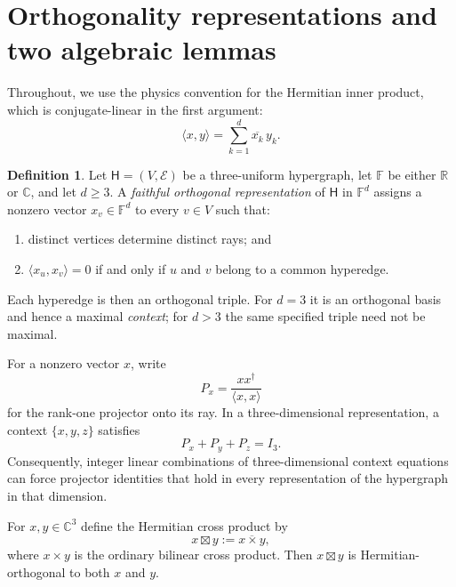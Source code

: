 \documentclass[twocolumn,aps,pra,floatfix,amsmath,amssymb,longbibliography]{revtex4-2}
\theoremstyle{definition}
\newtheorem{definition}[theorem]{Definition}
\theoremstyle{remark}
\newcommand{\C}{\mathbb C}
\newcommand{\R}{\mathbb R}
\begin{document}
\section{Orthogonality representations and two algebraic lemmas}

Throughout, we use the physics convention for the Hermitian inner product,
which is conjugate-linear in the first argument:
\begin{equation}
 \langle x,y\rangle=\sum_{k=1}^{d}\overline{x_k}\,y_k.
 \label{eq:inner-product}
\end{equation}

\begin{definition}
Let $\mathsf H=(V,\mathcal E)$ be a three-uniform hypergraph, let
$\mathbb F$ be either $\R$ or $\C$, and let $d\ge3$.  A \emph{faithful
orthogonal representation} of $\mathsf H$ in $\mathbb F^d$ assigns a nonzero
vector $x_v\in\mathbb F^d$ to every $v\in V$ such that:
\begin{enumerate}
\item distinct vertices determine distinct rays; and
\item $\langle x_u,x_v\rangle=0$ if and only if $u$ and $v$ belong to a
common hyperedge.
\end{enumerate}
Each hyperedge is then an orthogonal triple.  For $d=3$ it is an orthogonal
basis and hence a maximal \emph{context}; for $d>3$ the same specified triple
need not be maximal.
\end{definition}

For a nonzero vector $x$, write
\begin{equation}
 P_x=\frac{xx^\dagger}{\langle x,x\rangle}
 \label{eq:projector}
\end{equation}
for the rank-one projector onto its ray.  In a three-dimensional
representation, a context $\{x,y,z\}$ satisfies
\begin{equation}
 P_x+P_y+P_z=I_3.
 \label{eq:context-sum}
\end{equation}
Consequently, integer linear combinations of three-dimensional context
equations can force projector identities that hold in every representation
of the hypergraph in that dimension.

For $x,y\in\C^3$ define the Hermitian cross product by
\begin{equation}
 x\boxtimes y:=\overline{x\times y},
 \label{eq:hcross}
\end{equation}
where $x\times y$ is the ordinary bilinear cross product.  Then
$x\boxtimes y$ is Hermitian-orthogonal to both $x$ and $y$.
\end{document}
